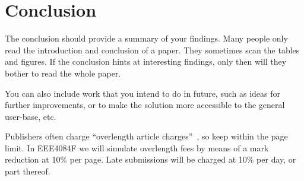 \section{Conclusion}
The conclusion should provide a summary of your findings.  Many people only read the introduction and conclusion of a paper.  They sometimes scan the tables and figures.  If the conclusion hints at interesting findings, only then will they bother to read the whole paper.

You can also include work that you intend to do in future, such as ideas for further improvements, or to make the solution more accessible to the general user-base, etc.

Publishers often charge ``overlength article charges''~\cite{Overlength_Fee}, so keep within the page limit.  In EEE4084F we will simulate overlength fees by means of a mark reduction at 10\% per page.  Late submissions will be charged at 10\% per day, or part thereof.
